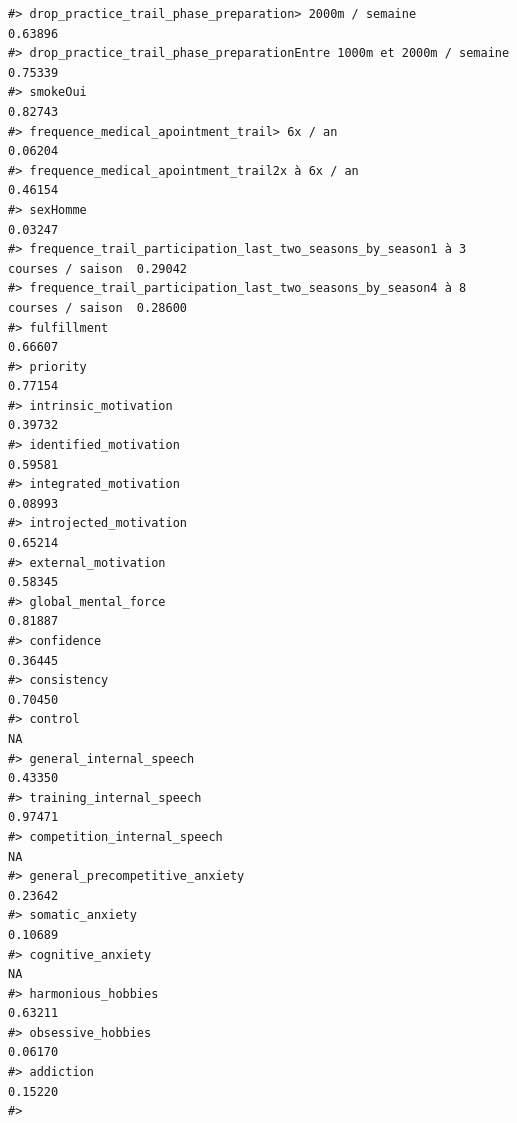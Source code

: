 \documentclass[
]{article}
\begin{document}
\begin{verbatim}
#> drop_practice_trail_phase_preparation> 2000m / semaine                          0.63896
#> drop_practice_trail_phase_preparationEntre 1000m et 2000m / semaine             0.75339
#> smokeOui                                                                        0.82743
#> frequence_medical_apointment_trail> 6x / an                                     0.06204
#> frequence_medical_apointment_trail2x à 6x / an                                  0.46154
#> sexHomme                                                                        0.03247
#> frequence_trail_participation_last_two_seasons_by_season1 à 3 courses / saison  0.29042
#> frequence_trail_participation_last_two_seasons_by_season4 à 8 courses / saison  0.28600
#> fulfillment                                                                     0.66607
#> priority                                                                        0.77154
#> intrinsic_motivation                                                            0.39732
#> identified_motivation                                                           0.59581
#> integrated_motivation                                                           0.08993
#> introjected_motivation                                                          0.65214
#> external_motivation                                                             0.58345
#> global_mental_force                                                             0.81887
#> confidence                                                                      0.36445
#> consistency                                                                     0.70450
#> control                                                                              NA
#> general_internal_speech                                                         0.43350
#> training_internal_speech                                                        0.97471
#> competition_internal_speech                                                          NA
#> general_precompetitive_anxiety                                                  0.23642
#> somatic_anxiety                                                                 0.10689
#> cognitive_anxiety                                                                    NA
#> harmonious_hobbies                                                              0.63211
#> obsessive_hobbies                                                               0.06170
#> addiction                                                                       0.15220
#>                                                                                  

\end{verbatim}
\end{document}
